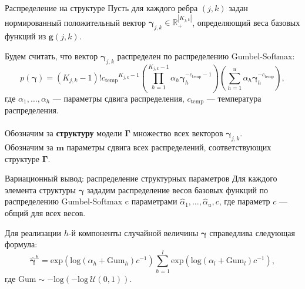 \documentclass[usenames,dvipsnames,11pt,pdf,utf8,russian,aspectratio=169]{beamer}
\begin{document}
\begin{frame}{ Распределение на структуре}
Пусть для каждого ребра $(j,k)$ задан нормированный положительный вектор $\boldsymbol{\gamma}_{j,k} \in \mathbb{R}_{+}^{|K_{j,k}|}$, определяющий веса базовых функций из  $\mathbf{g}(j,k)$.

Будем считать, что вектор $\boldsymbol{\gamma}_{j,k}$ распределен по распределению Gumbel-Softmax:
\[
    p(\boldsymbol{\gamma}) = (K_{j,k}-1)!{c_{\text{temp}}}^{K_{j,k}-1}\left(\prod_{h=1}^{K_{j,k}-1} \alpha_h \boldsymbol{\gamma}_h^{-c_{\text{temp}}-1}\right)\left(\sum_{h=1}^u\alpha_h\boldsymbol{\gamma}_h^{-c_{\text{temp}}}\right),
\] 
где $\alpha_1,\dots,\alpha_h$ --- параметры сдвига распределения, $c_{\text{temp}}$ --- температура распределения. 
\\~\\
Обозначим за \textbf{структуру} модели $\boldsymbol{\Gamma}$ множество всех векторов $\boldsymbol{\gamma}_{j,k}$.\\
Обозначим за $\mathbf{m}$ параметры сдвига всех распределений, соответствующих структуре $\boldsymbol{\Gamma}$.

\end{frame}




\begin{frame}{Вариационный вывод: распределение структурных параметров}
Для каждого элемента структуры $\boldsymbol{\gamma}$ зададим распределение весов базовых функций по распределению Gumbel-Softmax c параметрами $\hat{\alpha}_1, \dots, \hat{\alpha}_u, c$, где параметр $c$ --- общий для всех весов.

Для реализации $h$-й компоненты случайной величины $\boldsymbol{\gamma}$ справедлива следующая формула:
\[
    \hat{\boldsymbol{\gamma}}^h = \text{exp}\left(\text{log}\left(\alpha_h + \text{Gum}_h\right)c^{-1}\right) \sum_{h=1}^l \text{exp}\left(\text{log}\left(\alpha_l + \text{Gum}_l\right)c^{-1}\right),
\]
где $\text{Gum} \sim -\text{log}(-\text{log}~\mathcal{U}(0,1)).$ 
\end{frame}

\iffalse
\end{document}

